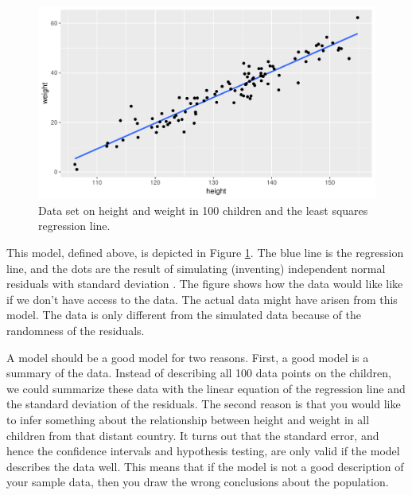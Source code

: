 \documentclass[]{report}\usepackage[]{graphicx}\usepackage[]{color}
\makeatletter
\def\maxwidth{ %
  \ifdim\Gin@nat@width>\linewidth
    \linewidth
  \else
    \Gin@nat@width
  \fi
}
\newenvironment{knitrout}{}{} %
\makeatother
\begin{document}
\begin{knitrout}
\color{fgcolor}\begin{figure}

{\centering \includegraphics[width=\maxwidth]{figure/ass_2-1} 

}

\caption[Data set on height and weight in 100 children and the least squares regression line]{Data set on height and weight in 100 children and the least squares regression line.}\label{fig:ass_2}
\end{figure}


\end{knitrout}


This model, defined above, is depicted in Figure \ref{fig:ass_2}. The blue line is the regression line, and the dots are the result of simulating (inventing) independent normal residuals with standard deviation . The figure shows how the data would like like if we don't have access to the data. 
The actual data might have arisen from this model. The data is only different from the simulated data because of the randomness of the residuals. 

A model should be a good model for two reasons. First, a good model is a summary of the data. Instead of describing all 100 data points on the children, we could summarize these data with the linear equation of the regression line and the standard deviation of the residuals. The second reason is that you would like to infer something about the relationship between height and weight in all children from that distant country. It turns out that the standard error, and hence the confidence intervals  and hypothesis testing, are only valid if the model describes the data well. This means that if the model is not a good description of your sample data, then you draw the wrong conclusions about the population.
\end{document}

